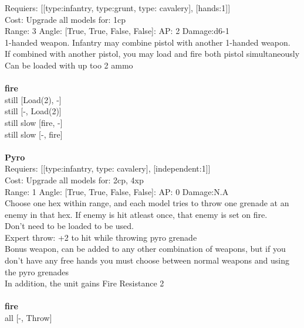 Requiers: [[type:infantry, type:grunt, type: cavalery], [hands:1]] \\
Cost: Upgrade all models for: 1cp \\


Range: 3  Angle: [True, True, False, False]: AP: 2 Damage:d6-1 \\
1-handed weapon. Infantry may combine pistol with another 1-handed weapon.\\ 
If combined with another pistol, you may load and fire both pistol simultaneously\\ 
Can be loaded with up too 2 ammo\\ 







\ \\ {\bf fire } \\
still [Load(2), -] \\
still [-, Load(2)] \\
still slow [fire, -] \\
still slow [-, fire] \\

\ \\
{\bf Pyro } \\

Requiers: [[type:infantry, type: cavalery], [independent:1]] \\
Cost: Upgrade all models for: 2cp, 4xp \\


Range: 1  Angle: [True, True, False, False]: AP: 0 Damage:N.A \\
Choose one hex within range, and each model tries to throw one grenade at an enemy in that hex. If enemy is hit atleast once, that enemy is set on fire.\\ 
Don't need to be loaded to be used.\\ 
Expert throw: +2 to hit while throwing pyro grenade\\ 
Bonus weapon, can be added to any other combination of weapons, but if you don't have any free hands you must choose between normal weapons and using the pyro grenades\\ 
In addition, the unit gains Fire Resistance 2\\ 







\ \\ {\bf fire } \\
all [-, Throw] \\

